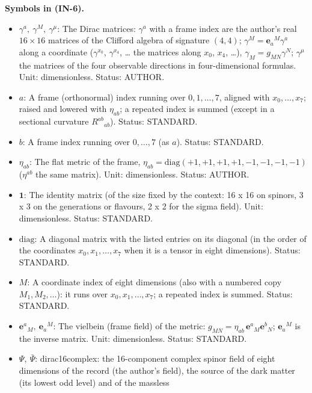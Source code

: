 \documentclass[
  10pt,
]{article}
\providecommand{\tightlist}{%
  \setlength{\itemsep}{0pt}\setlength{\parskip}{0pt}}
\begin{document}
\textbf{Symbols in (IN-6).}

\begin{itemize}
\tightlist
\item
  \(\gamma^a,\ \gamma^M,\ \gamma^\mu\): The Dirac matrices: \(\gamma^a\)
  with a frame index are the author's real \(16 \times 16\) matrices of
  the Clifford algebra of signature \((4, 4)\);
  \(\gamma^M = \mathbf{e}_a{}^M\gamma^a\) along a coordinate
  (\(\gamma^{x_0}\), \(\gamma^{x_4}\), \ldots{} the matrices along
  \(x_0\), \(x_4\), \ldots), \(\gamma_M = g_{MN}\gamma^N\);
  \(\gamma^\mu\) the matrices of the four observable directions in
  four-dimensional formulas. Unit: dimensionless. Status: AUTHOR.
\item
  \(a\): A frame (orthonormal) index running over \(0, 1, \dots, 7\),
  aligned with \(x_0, \dots, x_7\); raised and lowered with
  \(\eta_{ab}\); a repeated index is summed (except in a sectional
  curvature \(R^{ab}{}_{ab}\)). Status: STANDARD.
\item
  \(b\): A frame index running over \(0, \dots, 7\) (as \(a\)). Status:
  STANDARD.
\item
  \(\eta_{ab}\): The flat metric of the frame,
  \(\eta_{ab} = \mathrm{diag}(+1, +1, +1, +1, -1, -1, -1, -1)\)
  (\(\eta^{ab}\) the same matrix). Unit: dimensionless. Status: AUTHOR.
\item
  \(\mathbf{1}\): The identity matrix (of the size fixed by the context:
  16 x 16 on spinors, 3 x 3 on the generations or flavours, 2 x 2 for
  the sigma field). Unit: dimensionless. Status: STANDARD.
\item
  \(\mathrm{diag}\): A diagonal matrix with the listed entries on its
  diagonal (in the order of the coordinates \(x_0, x_1, \dots, x_7\)
  when it is a tensor in eight dimensions). Status: STANDARD.
\item
  \(M\): A coordinate index of eight dimensions (also with a numbered
  copy \(M_1, M_2, \dots\)): it runs over \(x_0, x_1, \dots, x_7\); a
  repeated index is summed. Status: STANDARD.
\item
  \(\mathbf{e}^a{}_M,\ \mathbf{e}_a{}^M\): The vielbein (frame field) of
  the metric: \(g_{MN} = \eta_{ab}\,\mathbf{e}^a{}_M\mathbf{e}^b{}_N\);
  \(\mathbf{e}_a{}^M\) is the inverse matrix. Unit: dimensionless.
  Status: STANDARD.
\item
  \(\Psi,\ \bar\Psi\): dirac16complex: the 16-component complex spinor
  field of eight dimensions of the record (the author's field), the
  source of the dark matter (its lowest odd level) and of the massless

\end{itemize}
\end{document}
